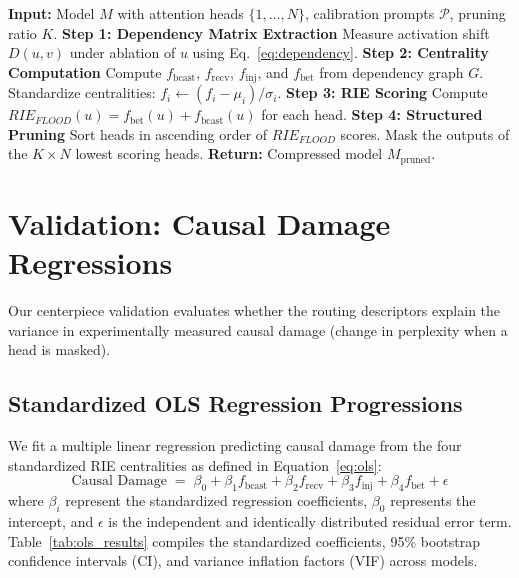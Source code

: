 \documentclass[11pt,a4paper]{article}
\theoremstyle{definition}
\theoremstyle{plain}
\begin{document}
\begin{algorithm}[H]
\caption{RIE Scoring and FLOOD Attention Head Pruning}
\label{alg:flood}
\begin{algorithmic}[1]
\State \textbf{Input:} Model $M$ with attention heads $\{1, \dots, N\}$, calibration prompts $\mathcal{P}$, pruning ratio $K$.
\State \textbf{Step 1: Dependency Matrix Extraction}
    \State Measure activation shift $D(u, v)$ under ablation of $u$ using Eq.~\ref{eq:dependency}.
\EndFor
\State \textbf{Step 2: Centrality Computation}
\State Compute $f_{\text{bcast}}$, $f_{\text{recv}}$, $f_{\text{inj}}$, and $f_{\text{bet}}$ from dependency graph $G$.
\State Standardize centralities: $f_i \leftarrow (f_i - \mu_i) / \sigma_i$.
\State \textbf{Step 3: RIE Scoring}
\State Compute $RIE_{FLOOD}(u) = f_{\text{bet}}(u) + f_{\text{bcast}}(u)$ for each head.
\State \textbf{Step 4: Structured Pruning}
\State Sort heads in ascending order of $RIE_{FLOOD}$ scores.
\State Mask the outputs of the $K \times N$ lowest scoring heads.
\State \textbf{Return:} Compressed model $M_{\text{pruned}}$.
\end{algorithmic}
\end{algorithm}

\section{Validation: Causal Damage Regressions}
\label{sec:validation}

Our centerpiece validation evaluates whether the routing descriptors explain the variance in experimentally measured causal damage (change in perplexity when a head is masked).

\subsection{Standardized OLS Regression Progressions}
We fit a multiple linear regression predicting causal damage from the four standardized RIE centralities as defined in Equation~\ref{eq:ols}:
\begin{equation}
    \text{Causal Damage} \;=\; \beta_0 + \beta_1 f_{\text{bcast}} + \beta_2 f_{\text{recv}} + \beta_3 f_{\text{inj}} + \beta_4 f_{\text{bet}} + \epsilon
    \label{eq:ols}
\end{equation}
where $\beta_i$ represent the standardized regression coefficients, $\beta_0$ represents the intercept, and $\epsilon$ is the independent and identically distributed residual error term. Table~\ref{tab:ols_results} compiles the standardized coefficients, 95\% bootstrap confidence intervals (CI), and variance inflation factors (VIF) across models.
\end{document}
